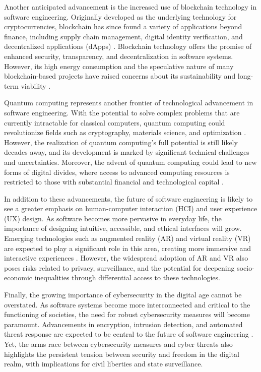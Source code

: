 \begin{refsection}
Another anticipated advancement is the increased use of blockchain technology in software engineering. Originally developed as the underlying technology for cryptocurrencies, blockchain has since found a variety of applications beyond finance, including supply chain management, digital identity verification, and decentralized applications (dApps) \cite[pp.~45-48]{tapscott2016blockchain}. Blockchain technology offers the promise of enhanced security, transparency, and decentralization in software systems. However, its high energy consumption and the speculative nature of many blockchain-based projects have raised concerns about its sustainability and long-term viability \cite[pp.~87-89]{scholz2016platform}.

Quantum computing represents another frontier of technological advancement in software engineering. With the potential to solve complex problems that are currently intractable for classical computers, quantum computing could revolutionize fields such as cryptography, materials science, and optimization \cite[pp.~112-115]{nielsen2010quantum}. However, the realization of quantum computing’s full potential is still likely decades away, and its development is marked by significant technical challenges and uncertainties. Moreover, the advent of quantum computing could lead to new forms of digital divides, where access to advanced computing resources is restricted to those with substantial financial and technological capital \cite[pp.~98-101]{benkler2010wealth}.

In addition to these advancements, the future of software engineering is likely to see a greater emphasis on human-computer interaction (HCI) and user experience (UX) design. As software becomes more pervasive in everyday life, the importance of designing intuitive, accessible, and ethical interfaces will grow. Emerging technologies such as augmented reality (AR) and virtual reality (VR) are expected to play a significant role in this area, creating more immersive and interactive experiences \cite[pp.~75-78]{bollier2016commons}. However, the widespread adoption of AR and VR also poses risks related to privacy, surveillance, and the potential for deepening socio-economic inequalities through differential access to these technologies.

Finally, the growing importance of cybersecurity in the digital age cannot be overstated. As software systems become more interconnected and critical to the functioning of societies, the need for robust cybersecurity measures will become paramount. Advancements in encryption, intrusion detection, and automated threat response are expected to be central to the future of software engineering \cite[pp.~120-123]{stallman2010free}. Yet, the arms race between cybersecurity measures and cyber threats also highlights the persistent tension between security and freedom in the digital realm, with implications for civil liberties and state surveillance.


\end{refsection}

